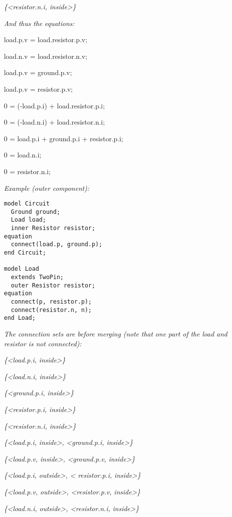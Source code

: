 \emph{\{\textless{}resistor.n.i, inside\textgreater{}\}}

\emph{And thus the equations:}

load.p.v = load.resistor.p.v;

load.n.v = load.resistor.n.v;

load.p.v = ground.p.v;

load.p.v = resistor.p.v;

0 = (-load.p.i) + load.resistor.p.i;

0 = (-load.n.i) + load.resistor.n.i;

0 = load.p.i + ground.p.i + resistor.p.i;

0 = load.n.i;

0 = resistor.n.i;

\emph{Example (outer component):}

\begin{lstlisting}[language=modelica]
model Circuit
  Ground ground;
  Load load;
  inner Resistor resistor;
equation
  connect(load.p, ground.p);
end Circuit;

model Load
  extends TwoPin;
  outer Resistor resistor;
equation
  connect(p, resistor.p);
  connect(resistor.n, n);
end Load;
\end{lstlisting}
\emph{The connection sets are before merging (note that one part of the
load and resistor is not connected):}

\emph{\{\textless{}load.p.i, inside\textgreater{}\}}

\emph{\{\textless{}load.n.i, inside\textgreater{}\}}

\emph{\{\textless{}ground.p.i, inside\textgreater{}\}}

\emph{\{\textless{}resistor.p.i, inside\textgreater{}\}}

\emph{\{\textless{}resistor.n.i, inside\textgreater{}\}}

\emph{\{\textless{}load.p.i, inside\textgreater{},
\textless{}ground.p.i, inside\textgreater{}\}}

\emph{\{\textless{}load.p.v, inside\textgreater{},
\textless{}ground.p.v, inside\textgreater{}\}}

\emph{\{\textless{}load.p.i, outside\textgreater{}, \textless{}
resistor.p.i, inside\textgreater{}\}}

\emph{\{\textless{}load.p.v, outside\textgreater{},
\textless{}resistor.p.v, inside\textgreater{}\}}

\emph{\{\textless{}load.n.i, outside\textgreater{},
\textless{}resistor.n.i, inside\textgreater{}\}}

